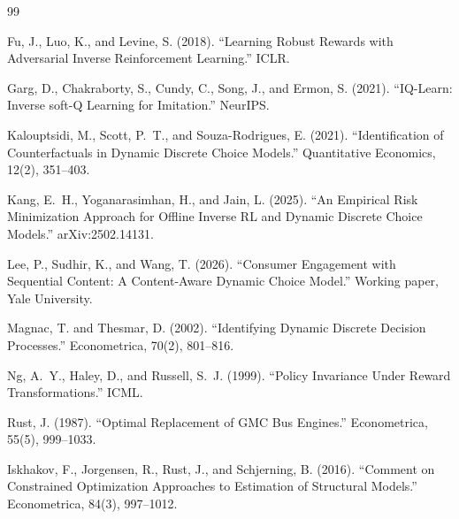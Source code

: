 \documentclass[11pt]{article}
\begin{document}

\begin{thebibliography}{99}

Fu, J., Luo, K., and Levine, S. (2018). ``Learning Robust Rewards with Adversarial Inverse Reinforcement Learning.'' ICLR.

Garg, D., Chakraborty, S., Cundy, C., Song, J., and Ermon, S. (2021). ``IQ-Learn: Inverse soft-Q Learning for Imitation.'' NeurIPS.

Kalouptsidi, M., Scott, P.~T., and Souza-Rodrigues, E. (2021). ``Identification of Counterfactuals in Dynamic Discrete Choice Models.'' Quantitative Economics, 12(2), 351--403.

Kang, E.~H., Yoganarasimhan, H., and Jain, L. (2025). ``An Empirical Risk Minimization Approach for Offline Inverse RL and Dynamic Discrete Choice Models.'' arXiv:2502.14131.

Lee, P., Sudhir, K., and Wang, T. (2026). ``Consumer Engagement with Sequential Content: A Content-Aware Dynamic Choice Model.'' Working paper, Yale University.

Magnac, T. and Thesmar, D. (2002). ``Identifying Dynamic Discrete Decision Processes.'' Econometrica, 70(2), 801--816.

Ng, A.~Y., Haley, D., and Russell, S.~J. (1999). ``Policy Invariance Under Reward Transformations.'' ICML.

Rust, J. (1987). ``Optimal Replacement of GMC Bus Engines.'' Econometrica, 55(5), 999--1033.

Iskhakov, F., Jorgensen, R., Rust, J., and Schjerning, B. (2016). ``Comment on Constrained Optimization Approaches to Estimation of Structural Models.'' Econometrica, 84(3), 997--1012.

\end{thebibliography}
\end{document}
